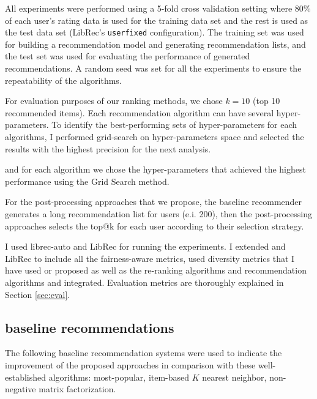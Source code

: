     All experiments were performed using a 5-fold cross validation setting where 80\% of each user's rating data is used for the training data set and the rest is used as the test data set (LibRec's \texttt{userfixed} configuration). The training set was used for building a recommendation model and generating recommendation lists, and the test set was used for evaluating
    the performance of generated recommendations. A random seed was set for all the experiments to ensure the repeatability of the algorithms.
    
    For evaluation purposes of our ranking methods, we chose $k = 10$ (top 10 recommended items). Each recommendation algorithm can have several hyper-parameters. To identify the best-performing sets of hyper-parameters for each algorithms, I performed grid-search on hyper-parameters space and selected the results with the highest precision for the next analysis. 
    
    
    and for each algorithm we chose the hyper-parameters that achieved the highest performance using the Grid Search method.
    
    For the post-processing approaches that we propose, the baseline recommender generates a long recommendation list for users (e.i. 200), then the post-processing approaches selects the top@k for each user according to their selection strategy.
    
    I used librec-auto and LibRec for running the experiments\cite{burke2020facct_libauto,Sonboli2020FARLA,guo2015librec,mansoury2019algorithm,mansoury2018automating}. I extended \libauto{} and LibRec to include all the fairness-aware metrics, used diversity metrics that I have used or proposed as well as the re-ranking algorithms and recommendation algorithms and integrated. Evaluation metrics are thoroughly explained in Section \ref{sec:eval}.

    
    \subsection{baseline recommendations}
    
        The following baseline recommendation systems were used to indicate the improvement of the proposed approaches in comparison with these well-established algorithms: most-popular, item-based $K$ nearest neighbor, non-negative matrix factorization. 
        
